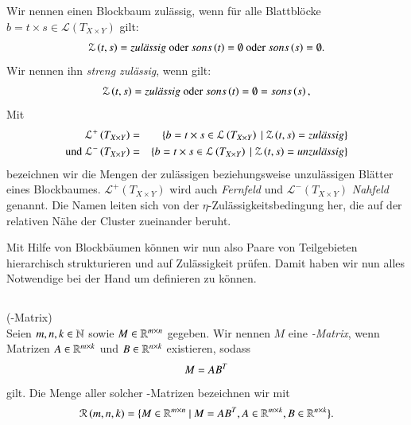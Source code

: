 \begin{defn}
	Wir nennen einen Blockbaum zulässig, wenn für alle Blattblöcke $b = t \times s \in \mathcal{L}\left(T_{X \times Y}\right)$ gilt:
	\begin{equation*}
	  \mathcal{Z}\left(t,s\right) = \text{\textit{zulässig}} \text{ oder }
	  sons\left(t\right) = \emptyset \text{ oder }
	  sons\left(s\right) = \emptyset.
	\end{equation*}      
	Wir nennen ihn \textit{streng zulässig}, wenn gilt:
	\begin{equation*}
	  \mathcal{Z}\left(t,s\right) = \text{\textit{zulässig}} \text{ oder }
	  sons\left(t\right) = \emptyset = sons\left(s\right),
	\end{equation*}
	Mit
	\begin{eqnarray*}
		      \mathcal{L}^+\left(T_{X \times Y}\right) &=& \{ b = t \times s \in  \mathcal{L}\left(T_{X \times Y}\right) \ | \ \mathcal{Z}\left(t,s\right) = \ttit{zulässig} \}\\
	  \text{und } \mathcal{L}^-\left(T_{X \times Y}\right) &=& \{ b = t \times s \in  \mathcal{L}\left(T_{X \times Y}\right) \ | \ \mathcal{Z}\left(t,s\right) = \ttit{unzulässig} \}
	\end{eqnarray*}
	bezeichnen wir die Mengen der zulässigen beziehungsweise unzulässigen Blätter eines Blockbaumes. $\mathcal{L}^+\left(T_{X \times Y}\right)$ wird auch \textit{Fernfeld} und 
	$\mathcal{L}^-\left(T_{X \times Y}\right)$ \textit{Nahfeld} genannt. Die Namen leiten sich von der $\eta$-Zulässigkeitsbedingung her, die auf der relativen Nähe der Cluster zueinander beruht.
	
      \end{defn}

      Mit Hilfe von Blockbäumen können wir nun also Paare von Teilgebieten hierarchisch strukturieren und auf Zulässigkeit prüfen. Damit haben wir nun alles Notwendige bei der Hand um \hmat 
      definieren zu können.
      
  \subsection{\hmat}
  \label{sek:hmat}
    \begin{defn}
      (\Rk-Matrix)\\
      Seien $m,n,k \in \mathbb{N}$ sowie $M \in \mathbb{R}^{m \times n}$ gegeben. Wir nennen $M$ eine \textit{\Rk-Matrix}, wenn Matrizen $A \in \mathbb{R}^{m \times k}$ und $B \in \mathbb{R}^{n \times k}$  existieren, sodass
      \begin{equation*}
	M = A B^T
      \end{equation*}
      gilt. Die Menge aller solcher \Rk-Matrizen bezeichnen wir mit
      \begin{equation*}
	\mathcal{R}\left(m,n,k\right) = \{M \in \mathbb{R}^{m \times n} \ | \ M = AB^T, A \in \mathbb{R}^{m \times k}, B \in \mathbb{R}^{n \times k}\}.
      \end{equation*}
      \citep{nichtlokop}
    \end{defn}
    
